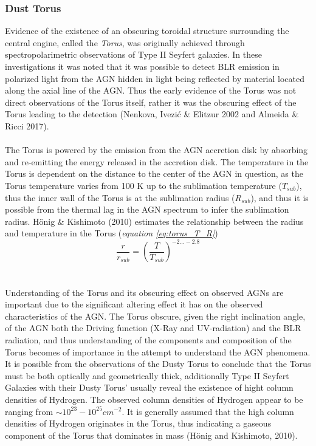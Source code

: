 \documentclass[a4paper, 12pt, twoside]{article}
\begin{document}
\subsubsection{Dust Torus} \label{torus}
Evidence of the existence of an obscuring toroidal structure surrounding the central engine, called the \emph{Torus}, was originally achieved through spectropolarimetric observations of Type II Seyfert galaxies. In these investigations it was noted that it was possible to detect BLR emission in polarized light from the AGN hidden in light being reflected by material located along the axial line of the AGN. Thus the early evidence of the Torus was not direct observations of the Torus itself, rather it was the obscuring effect of the Torus leading to the detection (Nenkova, Ivezić \& Elitzur 2002\cite{Nenkova2002} and Almeida \& Ricci 2017\cite{Almeida2017}).\\
\\
The Torus is powered by the emission from the AGN accretion disk by absorbing and re-emitting the energy released in the accretion disk. The temperature in the Torus is dependent on the distance to the center of the AGN in question, as the Torus temperature varies from 100 K up to the sublimation temperature ($T_{sub}$), thus the inner wall of the Torus is at the sublimation radius ($R_{sub}$), and thus it is possible from the thermal lag in the AGN spectrum to infer the sublimation radius. Hönig \& Kishimoto (2010)\cite{Honig2010} estimates the relationship between the radius and temperature in the Torus (\emph{equation \ref{eq:torus_T_R}}) 
\begin{equation}
\frac{r}{r_{sub}} = (\frac{T}{T_{sub}})^{-2...-2.8}
\label{eq:torus_T_R}
\end{equation}\\
\\
Understanding of the Torus and its obscuring effect on observed AGNs are important due to the significant altering effect it has on the observed characteristics of the AGN. The Torus obscure, given the right inclination angle, of the AGN both the Driving function (X-Ray and UV-radiation) and the BLR radiation, and thus understanding of the components and composition of the Torus becomes of importance in the attempt to understand the AGN phenomena. It is possible from the observations of the Dusty Torus to conclude that the Torus must be both optically and geometrically thick, additionally Type II Seyfert Galaxies with their Dusty Torus' usually reveal the existence of hight column densities of Hydrogen. The observed column densities of Hydrogen appear to be ranging from $\sim 10^{23} - 10^{25} cm^{-2}$. It is generally assumed that the high column densities of Hydrogen originates in the Torus, thus indicating a gaseous component of the Torus that dominates in mass (Hönig and Kishimoto, 2010). \\
\end{document}
